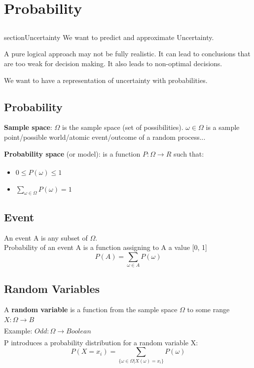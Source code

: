 \section{Probability}
\subsection{}section{Uncertainty}
We want to predict and approximate Uncertainty. 

A pure logical approach may not be fully realistic. It can lead to conclusions that are too weak for decision making. It also leads to non-optimal decisions.

We want to have a representation of uncertainty with probabilities.

\subsection{Probability}
\textbf{Sample space}: $\Omega$ is the sample space (set of possibilities). $\omega \in \Omega$ is a sample point/possible world/atomic event/outcome of a random process...

\textbf{Probability space} (or model): is a function $P: \Omega \xrightarrow[]{} R$ such that:
\begin{itemize}
    \item $0 \leq P(\omega)\leq 1$
    \item $\sum_{\omega \in \Omega} P(\omega) = 1$
\end{itemize}

\subsection{Event}
An event A is any subset of $\Omega$. \\
Probability of an event A is a function assigning to A a value [0, 1]
\begin{equation}
    P(A) = \sum_{\omega \in A} P(\omega)
\end{equation}
\subsection{Random Variables}
A \textbf{random variable} is a function from the sample space $\Omega$ to some range $X: \Omega \xrightarrow[]{}B$ \\
Example: $Odd: \Omega \xrightarrow[]{} Boolean$ \\
P introduces a probability distribution for a random variable X:
\begin{equation}
    P(X = x_{i}) = \sum_{\{\omega \in \Omega | X(\omega) = x_{i}\}} P(\omega)
\end{equation}
